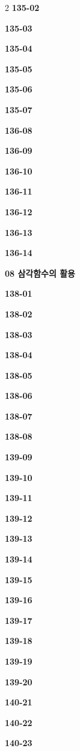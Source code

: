 \documentclass[10pt,a4paper]{article}
\begin{document}
\begin{multicols}{2}
\noindent\textbf{135-02}\ \par
\noindent\textbf{135-03}\ \par
\noindent\textbf{135-04}\ \par
\noindent\textbf{135-05}\ \par
\noindent\textbf{135-06}\ \par
\noindent\textbf{135-07}\ \par
\noindent\textbf{136-08}\ \par
\noindent\textbf{136-09}\ \par
\noindent\textbf{136-10}\ \par
\noindent\textbf{136-11}\ \par
\noindent\textbf{136-12}\ \par
\noindent\textbf{136-13}\ \par
\noindent\textbf{136-14}\ \par
\noindent\textbf{08 삼각함수의 활용}\par\smallskip
\noindent\textbf{138-01}\ \par
\noindent\textbf{138-02}\ \par
\noindent\textbf{138-03}\ \par
\noindent\textbf{138-04}\ \par
\noindent\textbf{138-05}\ \par
\noindent\textbf{138-06}\ \par
\noindent\textbf{138-07}\ \par
\noindent\textbf{138-08}\ \par
\noindent\textbf{139-09}\ \par
\noindent\textbf{139-10}\ \par
\noindent\textbf{139-11}\ \par
\noindent\textbf{139-12}\ \par
\noindent\textbf{139-13}\ \par
\noindent\textbf{139-14}\ \par
\noindent\textbf{139-15}\ \par
\noindent\textbf{139-16}\ \par
\noindent\textbf{139-17}\ \par
\noindent\textbf{139-18}\ \par
\noindent\textbf{139-19}\ \par
\noindent\textbf{139-20}\ \par
\noindent\textbf{140-21}\ \par
\noindent\textbf{140-22}\ \par
\noindent\textbf{140-23}\ \par

\end{multicols}
\end{document}
